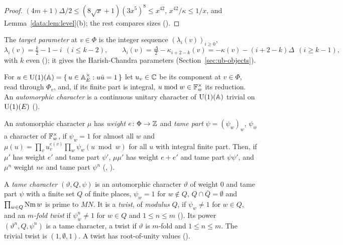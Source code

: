 \begin{proof}
$(4m+1)\Delta/2 \le (8\sqrt x+1)(3x^5)^8 \le x^{42}$, $x^{42}/\kappa \le 1/x$, and
Lemma~\ref{data:lem:level}(b); the rest compares sizes ().
\end{proof}

\begin{definition}
\label{data:def:target}
The \emph{target parameter} at $v \in \Phi$ is the integer sequence $(\lambda_i(v))_{i\ge0}$,
\[
  \lambda_i(v) = \tfrac k2 - 1 - i \ \ (i \le k-2), \qquad
  \lambda_i(v) = \tfrac\Delta2 - \kappa_{i+2-k}(v) = -\kappa(v) - (i+2-k)\Delta \ \ (i \ge k-1),
\]
with $k$ even (); it gives the Harish-Chandra parameters
(Section~\ref{sec:ub-objects}).
\end{definition}

For $u \in \operatorname{U}(1)(\mathbb{A}) = \{\, u \in \mathbb{A}_E^\times : u\bar u = 1 \,\}$ let $u_v \in \mathbb{C}$ be its component at
$v \in \Phi$, read through $\Phi_v$, and, if its finite part is integral, $u \bmod w \in \mathbb{F}_w^\times$
its reduction. An \emph{automorphic character} is a continuous unitary character of $\operatorname{U}(1)(\mathbb{A})$
trivial on $\operatorname{U}(1)(E)$ ().

\begin{definition}\label{data:def:hasweight}
An automorphic character $\mu$ has \emph{weight} $e \colon \Phi \to \mathbb{Z}$ and \emph{tame part}
$\psi = (\psi_w)_w$, $\psi_w$ a character of $\mathbb{F}_w^\times$, if $\psi_w = 1$ for almost all $w$ and
$\mu(u) = \prod_{v} u_v^{e(v)} \prod_w \psi_w(u \bmod w)$ for all $u$ with integral finite part.
Then, if $\mu'$ has weight $e'$ and tame part $\psi'$, $\mu\mu'$ has weight $e + e'$ and tame part
$\psi\psi'$, and $\mu^n$ weight $ne$ and tame part $\psi^n$ (,
).
\end{definition}

\begin{definition}\label{data:def:twist}
A \emph{tame character} $(\vartheta, Q, \psi)$ is an automorphic character $\vartheta$ of weight $0$
and tame part $\psi$ with a finite set $Q$ of finite places, $\psi_w = 1$ for $w \notin Q$,
$Q \cap \bar Q = \emptyset$ and $\prod_{w\in Q}\operatorname{Nm} w$ is prime to $MN$. It is a \emph{twist}, of
\emph{modulus} $Q$, if $\psi_w \ne 1$ for $w \in Q$, and an \emph{$m$-fold twist} if
$\psi_w^n \ne 1$ for $w \in Q$ and $1 \le n \le m$ (). Its power
$(\vartheta^n, Q, \psi^n)$ is a tame character, a twist if $\vartheta$ is $m$-fold and
$1 \le n \le m$. The trivial twist is
$(1, \emptyset, 1)$. A twist has root-of-unity values
().
\end{definition}

